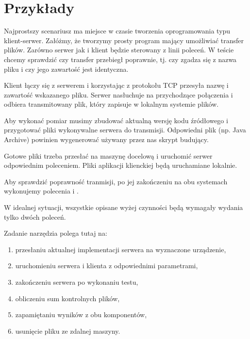 \documentclass[00-praca-magisterska.tex]{subfiles}
\begin{document}
\chapter{Przykłady}


Najprostszy scenariusz ma miejsce w czasie tworzenia oprogramowania typu
klient-serwer. Załóżmy, że tworzymy prosty program mający umożliwiać transfer
plików. Zarówno serwer jak i klient będzie sterowany z linii poleceń. W teście
chcemy sprawdzić czy transfer przebiegł poprawnie, tj. czy zgadza się z nazwa
pliku i czy jego zawartość jest identyczna.

Klient łączy się z serwerem i korzystając z protokołu TCP przesyła nazwę i
zawartość wskazanego pliku. Serwer nasłuchuje na przychodzące połączenia i
odbiera transmitowany plik, który zapisuje w lokalnym systemie plików.

Aby wykonać pomiar musimy zbudować aktualną wersję kodu źródłowego i
przygotować pliki wykonywalne serwera do transmisji. Odpowiedni plik (np. Java
Archive) powinien wygenerować używany przez nas skrypt budujący.

Gotowe pliki trzeba przesłać na maszynę docelową i uruchomić serwer odpowiednim
poleceniem. Pliki aplikacji klienckiej będą uruchamiane lokalnie.

Aby sprawdzić poprawność tranmisji, po jej zakończeniu na obu systemach
wykonujemy polecenia  i .

W idealnej sytuacji, wszystkie opisane wyżej czynności będą wymagały wydania
tylko dwóch poleceń.

Zadanie narzędzia polega tutaj na:
\begin{enumerate}
\item przesłaniu aktualnej implementacji serwera na wyznaczone urządzenie,
\item uruchomieniu serwera i klienta z odpowiednimi parametrami,
\item zakończeniu serwera po wykonaniu testu,
\item obliczeniu sum kontrolnych plików,
\item zapamiętaniu wyników z obu komponentów,
\item usunięcie pliku ze zdalnej maszyny.
\end{enumerate}
\end{document}
